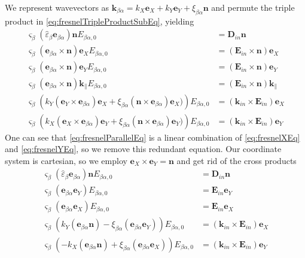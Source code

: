 \documentclass[12pt,a4paper,twoside,openright,BCOR10mm,headsepline,titlepage,abstracton,chapterprefix,final]{scrreprt}
\newcommand\Vector[1]{{\mathbf{#1}}}
\newcommand\wavenumber{k}
\newcommand\Wavevector{\Vector{\wavenumber}}
\newcommand\Tensor[1]{\hat{#1}}
\newcommand\scalarEfield{E}
\newcommand\scalarDfield{D}
\newcommand\Efield{\Vector{\scalarEfield}}
\newcommand\Dfield{\Vector{\scalarDfield}}
\newcommand\permittivity{\Tensor{\scalarpermittivity}}
\newcommand\scalarpermittivity{\varepsilon}
\begin{document}
We represent wavevectors as 
$\Wavevector_{\beta\alpha} = \wavenumber_{X} \Vector{e}_X + \wavenumber_{Y} \Vector{e}_Y + \xi_{\beta\alpha} \Vector{n}$
and permute the triple product in \eqref{eq:fresnelTripleProductSubEq}, yielding
\begin{subequations}
  \begin{align}
    \varsigma_\beta (\permittivity_\beta \Vector{e}_{\beta\alpha})\Vector{n} E_{\beta\alpha,0} &= \Dfield_{in} \Vector{n} \\
    \varsigma_\beta (\Vector{e}_{\beta\alpha} \times \Vector{n} ) \Vector{e}_X E_{\beta\alpha,0} &= (\Efield_{in} \times \Vector{n}) \Vector{e}_X \label{eq:fresnelXEq}\\
    \varsigma_\beta (\Vector{e}_{\beta\alpha} \times \Vector{n} ) \Vector{e}_Y E_{\beta\alpha,0} &= (\Efield_{in} \times \Vector{n}) \Vector{e}_Y \label{eq:fresnelYEq}\\
    \varsigma_\beta (\Vector{e}_{\beta\alpha} \times \Vector{n} ) \Wavevector_{\parallel} E_{\beta\alpha,0} &= (\Efield_{in} \times \Vector{n}) \Wavevector_{\parallel} \label{eq:fresnelParallelEq}\\
    \varsigma_\beta \left( \wavenumber_Y ( \Vector{e}_Y \times \Vector{e}_{\beta\alpha} ) \Vector{e}_X  + \xi_{\beta\alpha} ( \Vector{n} \times \Vector{e}_{\beta\alpha} ) \Vector{e}_X) \right) E_{\beta\alpha,0} &= (\Wavevector_{in} \times \Efield_{in}) \Vector{e}_X \\
    \varsigma_\beta \left( \wavenumber_X ( \Vector{e}_X \times \Vector{e}_{\beta\alpha} ) \Vector{e}_Y  + \xi_{\beta\alpha} ( \Vector{n} \times \Vector{e}_{\beta\alpha} ) \Vector{e}_Y) \right) E_{\beta\alpha,0} &= (\Wavevector_{in} \times \Efield_{in}) \Vector{e}_Y
  \end{align}
\end{subequations}
One can see that \eqref{eq:fresnelParallelEq} is a linear combination of \eqref{eq:fresnelXEq} and \eqref{eq:fresnelYEq},
so we remove this redundant equation.
Our coordinate system is cartesian, so we employ $\Vector{e}_X \times \Vector{e}_Y = \Vector{n}$ and get rid of the cross products
\begin{subequations}
  \begin{align}
    \varsigma_\beta (\permittivity_\beta \Vector{e}_{\beta\alpha})\Vector{n} E_{\beta\alpha,0} &= \Dfield_{in} \Vector{n} \label{eq:fresnelLastToSkip}\\
    \varsigma_\beta (\Vector{e}_{\beta\alpha} \Vector{e}_Y) E_{\beta\alpha,0} &= \Efield_{in} \Vector{e}_Y \\
    \varsigma_\beta (\Vector{e}_{\beta\alpha} \Vector{e}_X) E_{\beta\alpha,0} &= \Efield_{in} \Vector{e}_X \\
    \varsigma_\beta \left( \wavenumber_Y ( \Vector{e}_{\beta\alpha} \Vector{n} )  - \xi_{\beta\alpha} ( \Vector{e}_{\beta\alpha} \Vector{e}_Y) \right) E_{\beta\alpha,0} &= (\Wavevector_{in} \times \Efield_{in}) \Vector{e}_X \\
    \varsigma_\beta \left(-\wavenumber_X ( \Vector{e}_{\beta\alpha} \Vector{n} )  + \xi_{\beta\alpha} ( \Vector{e}_{\beta\alpha} \Vector{e}_X) \right) E_{\beta\alpha,0} &= (\Wavevector_{in} \times \Efield_{in}) \Vector{e}_Y
  \end{align}
\end{subequations}
\end{document}
